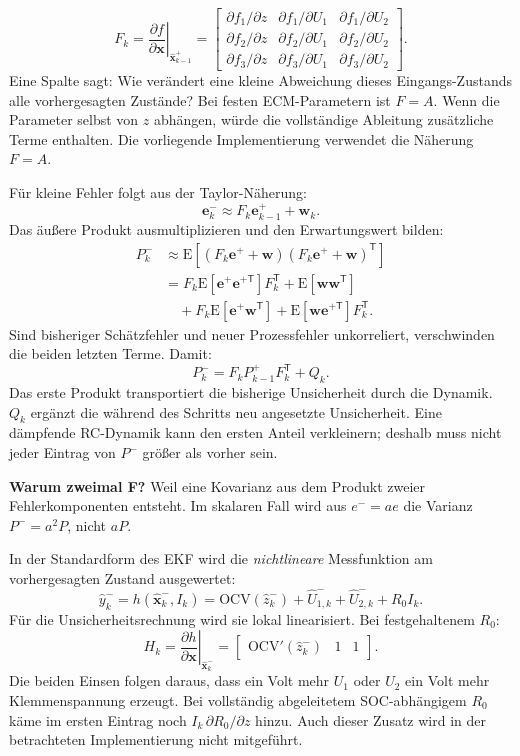\[
F_k=\left.\frac{\partial f}{\partial\mathbf x}\right|_{\hat{\mathbf x}_{k-1}^+}
=\begin{bmatrix}
\partial f_1/\partial z&\partial f_1/\partial U_1&\partial f_1/\partial U_2\\
\partial f_2/\partial z&\partial f_2/\partial U_1&\partial f_2/\partial U_2\\
\partial f_3/\partial z&\partial f_3/\partial U_1&\partial f_3/\partial U_2
\end{bmatrix}.
\]
Eine Spalte sagt: Wie verändert eine kleine Abweichung dieses Eingangs-Zustands alle vorhergesagten Zustände? Bei festen ECM-Parametern ist $F=A$. Wenn die Parameter selbst von $z$ abhängen, würde die vollständige Ableitung zusätzliche Terme enthalten. Die vorliegende Implementierung verwendet die Näherung $F=A$.

Für kleine Fehler folgt aus der Taylor-Näherung:
\[
\mathbf e_k^-\approx F_k\mathbf e_{k-1}^++\mathbf w_k.
\]
Das äußere Produkt ausmultiplizieren und den Erwartungswert bilden:
\[
\begin{aligned}
P_k^-&\approx\mathrm E[(F_k\mathbf e^++\mathbf w)
(F_k\mathbf e^++\mathbf w)^{\mathsf T}]\\
&=F_k\mathrm E[\mathbf e^+\mathbf e^{+\mathsf T}]F_k^{\mathsf T}
+\mathrm E[\mathbf w\mathbf w^{\mathsf T}]\\
&\quad+F_k\mathrm E[\mathbf e^+\mathbf w^{\mathsf T}]
+\mathrm E[\mathbf w\mathbf e^{+\mathsf T}]F_k^{\mathsf T}.
\end{aligned}
\]
Sind bisheriger Schätzfehler und neuer Prozessfehler unkorreliert, verschwinden die beiden letzten Terme. Damit:
\[
\boxed{P_k^-=F_kP_{k-1}^+F_k^{\mathsf T}+Q_k.}
\]
Das erste Produkt transportiert die bisherige Unsicherheit durch die Dynamik. $Q_k$ ergänzt die während des Schritts neu angesetzte Unsicherheit. Eine dämpfende RC-Dynamik kann den ersten Anteil verkleinern; deshalb muss nicht jeder Eintrag von $P^-$ größer als vorher sein.

\textbf{Warum zweimal F?} Weil eine Kovarianz aus dem Produkt zweier Fehlerkomponenten entsteht. Im skalaren Fall wird aus $e^-=ae$ die Varianz $P^-=a^2P$, nicht $aP$.

In der Standardform des EKF wird die \emph{nichtlineare} Messfunktion am vorhergesagten Zustand ausgewertet:
\[
\hat y_k^-=h(\hat{\mathbf x}_k^-,I_k)
=\mathrm{OCV}(\hat z_k^-)+\hat U_{1,k}^-+\hat U_{2,k}^-+R_0I_k.
\]
Für die Unsicherheitsrechnung wird sie lokal linearisiert. Bei festgehaltenem $R_0$:
\[
\boxed{H_k=\left.\frac{\partial h}{\partial\mathbf x}\right|_{\hat{\mathbf x}_k^-}
=\begin{bmatrix}\mathrm{OCV}'(\hat z_k^-)&1&1\end{bmatrix}.}
\]
Die beiden Einsen folgen daraus, dass ein Volt mehr $U_1$ oder $U_2$ ein Volt mehr Klemmenspannung erzeugt. Bei vollständig abgeleitetem SOC-abhängigem $R_0$ käme im ersten Eintrag noch $I_k\,\partial R_0/\partial z$ hinzu. Auch dieser Zusatz wird in der betrachteten Implementierung nicht mitgeführt.

